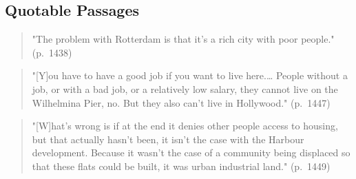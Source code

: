 \subsection*{Quotable Passages}

\begin{quote}
"The problem with Rotterdam is that it's a rich city with poor people." (p.~1438)
\end{quote}

\begin{quote}
"[Y]ou have to have a good job if you want to live here.\ldots{} People without a job, or with a bad job, or a relatively low salary, they cannot live on the Wilhelmina Pier, no. But they also can't live in Hollywood." (p.~1447)
\end{quote}

\begin{quote}
"[W]hat's wrong is if at the end it denies other people access to housing, but that actually hasn't been, it isn't the case with the Harbour development. Because it wasn't the case of a community being displaced so that these flats could be built, it was urban industrial land." (p.~1449)
\end{quote}
